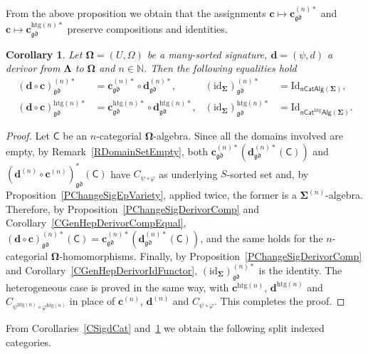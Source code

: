 \documentclass[a4paper, reqno]{amsbook}
\newcommand{\sig}[1]{\mathbf{#1}}             %
\newcommand{\calg}[1]{\boldsymbol{\mathsf{#1}}} %
\newcommand{\gd}{\mathfrak{gd}}              %
\newcommand{\htg}{\mathrm{htg}}                %
\newcommand{\id}{\mathrm{id}}
\newcommand{\Id}{\mathrm{Id}}
\theoremstyle{plain}
\newtheorem{corollary}[theorem]{Corollary}
\theoremstyle{definition}
\begin{document}
From the above proposition we obtain that the assignments $\mathbf{c}\mapsto\mathbf{c}^{(n)\ast}_{\gd}$ and $\mathbf{c}\mapsto\mathbf{c}^{\htg(n)\ast}_{\gd}$ preserve compositions and identities.

\begin{corollary}\label{CChangeSigFunctorComp}
Let $\sig{\Omega}=(U,\Omega)$ be a many-sorted signature, $\mathbf{d}=(\psi,d)$ a derivor from $\sig{\Lambda}$ to $\sig{\Omega}$ and $n\in\mathbb{N}$.
Then the following equalities hold
\begin{align*}
(\mathbf{d}\circ\mathbf{c})^{(n)\ast}_{\gd}&=\mathbf{c}^{(n)\ast}_{\gd}\circ\mathbf{d}^{(n)\ast}_{\gd},
&
(\id_{\sig{\Sigma}})^{(n)\ast}_{\gd}&=\Id_{\mathsf{nCatAlg}(\sig{\Sigma})},
\\
(\mathbf{d}\circ\mathbf{c})^{\htg(n)\ast}_{\gd}&=\mathbf{c}^{\htg(n)\ast}_{\gd}\circ\mathbf{d}^{\htg(n)\ast}_{\gd},
&
(\id_{\sig{\Sigma}})^{\htg(n)\ast}_{\gd}&=\Id_{\mathsf{nCat}^{\htg}\mathsf{Alg}(\sig{\Sigma})}.
\end{align*}
\end{corollary}
\begin{proof}
Let $\calg{C}$ be an $n$-categorial $\sig{\Omega}$-algebra.
Since all the domains involved are empty, by Remark~\ref{RDomainSetEmpty}, both $\mathbf{c}^{(n)\ast}_{\gd}(\mathbf{d}^{(n)\ast}_{\gd}(\calg{C}))$ and $(\mathbf{d}^{(n)}\circ\mathbf{c}^{(n)})^{\ast}_{\gd}(\calg{C})$ have $C_{\psi\circ\varphi}$ as underlying $S$-sorted set and, by Proposition~\ref{PChangeSigEpVariety}, applied twice, the former is a $\sig{\Sigma}^{(n)}$-algebra.
Therefore, by Proposition~\ref{PChangeSigDerivorComp} and Corollary~\ref{CGenHepDerivorCompEqual}, $(\mathbf{d}\circ\mathbf{c})^{(n)\ast}_{\gd}(\calg{C})=\mathbf{c}^{(n)\ast}_{\gd}(\mathbf{d}^{(n)\ast}_{\gd}(\calg{C}))$, and the same holds for the $n$-categorial $\sig{\Omega}$-homomorphisms.
Finally, by Proposition~\ref{PChangeSigDerivorComp} and Corollary~\ref{CGenHepDerivorIdFunctor}, $(\id_{\sig{\Sigma}})^{(n)\ast}_{\gd}$ is the identity.
The heterogeneous case is proved in the same way, with $\mathbf{c}^{\htg(n)}$, $\mathbf{d}^{\htg(n)}$ and $C_{\psi^{\htg(n)}\circ\varphi^{\htg(n)}}$ in place of $\mathbf{c}^{(n)}$, $\mathbf{d}^{(n)}$ and $C_{\psi\circ\varphi}$. This completes the proof.
\end{proof}

From Corollaries~\ref{CSigdCat} and~\ref{CChangeSigFunctorComp} we obtain the following split indexed categories.
\end{document}
